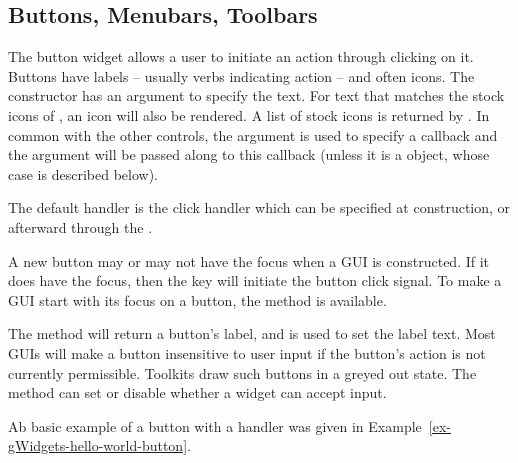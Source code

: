 \subsection{Buttons, Menubars, Toolbars}
\label{sec:gWidgets-buttons}

The button widget allows a user to initiate an action through clicking on
it. Buttons have labels -- usually verbs indicating action -- and often
icons. The  constructor has an argument
 to specify the text.  For text that matches
the stock icons of , an icon will also be rendered. A list of stock icons is returned by . In common with the other controls, the argument
 is used to specify a callback and the
 argument will be passed along to this
callback (unless it is a  object, whose case is described
below).

The default handler is the click handler which can be specified at
construction, or afterward through the
.


A new button may or may not have the focus when a GUI is
constructed. If it does have the focus, then the  key will
initiate the button click signal. To make a GUI start with its focus
on a button, the  method is available. 

The  method will return a button's label, and
 is used to set the label text.
Most GUIs will make a button insensitive to user input if the button's
action is not currently permissible. Toolkits draw such buttons in a
greyed out state. The  method can set or
disable whether a widget can accept input.

Ab basic example of a button with a handler was given in Example~\ref{ex-gWidgets-hello-world-button}.




